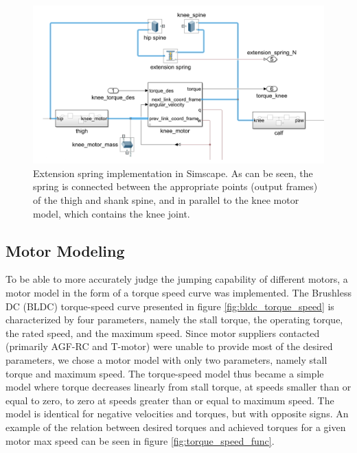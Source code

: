 \begin{figure}
    \centering
    \includegraphics[width=\textwidth]{Images/simscape_extension_spring.png}
    \caption{Extension spring implementation in Simscape. As can be seen, the spring is connected between the appropriate points (output frames) of the thigh and shank spine, and in parallel to the knee motor model, which contains the knee joint.}
    \label{fig:simscape_extension_spring}
\end{figure}

\subsection{Motor Modeling}
\label{sec:motor_modeling}

To be able to more accurately judge the jumping capability of different motors, a motor model in the form of a torque speed curve was implemented. The Brushless DC (BLDC) torque-speed curve presented in figure \ref{fig:bldc_torque_speed} is characterized by four parameters, namely the stall torque, the operating torque, the rated speed, and the maximum speed. Since motor suppliers contacted (primarily AGF-RC and T-motor) were unable to provide most of the desired parameters, we chose a motor model with only two parameters, namely stall torque and maximum speed. The torque-speed model thus became a simple model where torque decreases linearly from stall torque, at speeds smaller than or equal to zero, to zero at speeds greater than or equal to maximum speed. The model is identical for negative velocities and torques, but with opposite signs. An example of the relation between desired torques and achieved torques for a given motor max speed can be seen in figure \ref{fig:torque_speed_func}.

